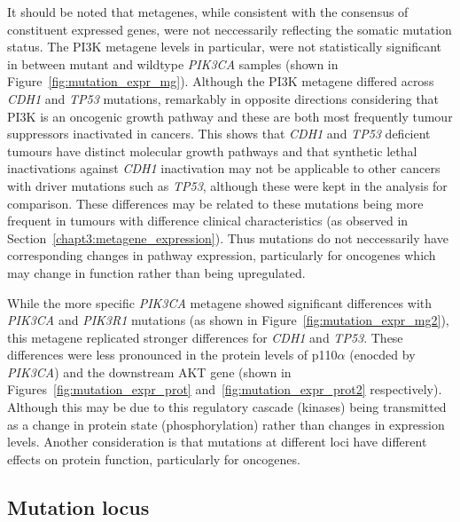 It should be noted that metagenes, while consistent with the consensus of constituent expressed genes, were not neccessarily reflecting the somatic mutation status. The PI3K \citep{Gatza2011} metagene levels in particular, were not statistically significant in between mutant and wildtype \textit{PIK3CA} samples (shown in Figure~\ref{fig:mutation_expr_mg}). Although the PI3K metagene differed across \textit{CDH1} and \textit{TP53} mutations, remarkably in opposite directions considering that PI3K is an oncogenic growth pathway and these are both most frequently tumour suppressors inactivated in cancers. This shows that \textit{CDH1} and \textit{TP53} deficient tumours have distinct molecular growth pathways and that synthetic lethal inactivations against \textit{CDH1} inactivation may not be applicable to other cancers with driver mutations such as \textit{TP53}, although these were kept in the analysis for comparison. These differences may be related to these mutations being more frequent in tumours with difference clinical characteristics (as observed in Section~\ref{chapt3:metagene_expression}).  Thus mutations do not neccessarily have corresponding changes in pathway expression, particularly for oncogenes which may change in function rather than being upregulated.


While the more specific \textit{PIK3CA} \citep{Gatza2014} metagene showed significant differences with \textit{PIK3CA} and \textit{PIK3R1} mutations (as shown in Figure~\ref{fig:mutation_expr_mg2}), this metagene replicated stronger differences for \textit{CDH1} and \textit{TP53}.  These differences were less pronounced in the protein levels of p110$\alpha$ (enocded by \textit{PIK3CA}) and the downstream AKT gene (shown in Figures~\ref{fig:mutation_expr_prot} and~\ref{fig:mutation_expr_prot2} respectively). Although this may be due to this regulatory cascade (kinases) being transmitted as a change in protein state (phosphorylation) rather than changes in expression levels. Another consideration is that mutations at different loci have different effects on protein function, particularly for oncogenes.

\FloatBarrier

\subsection{Mutation locus}  \label{chapt3:metagene_mut_locus}

